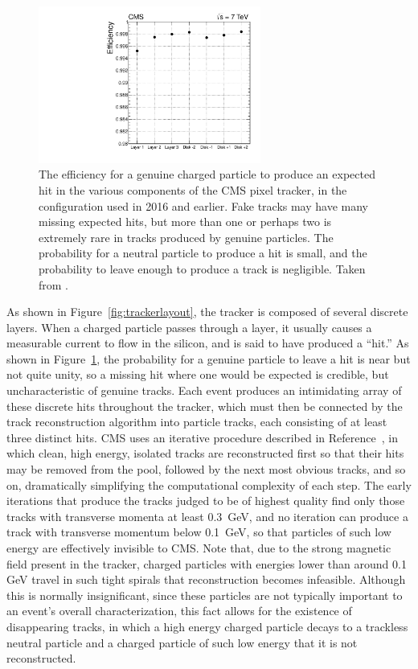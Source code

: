   \begin{figure}[h!]
    \centering
    \includegraphics[width=0.65\textwidth]{figures/hitefficiency.pdf}
    \caption[Efficiency for a genuine particle to leave an expected hit in the CMS tracker.]{
      The efficiency for a genuine charged particle to produce an expected hit in the various components of the CMS pixel tracker, in the configuration used in 2016 and earlier. 
      Fake tracks may have many missing expected hits, but more than one or perhaps two is extremely rare in tracks produced by genuine particles.
      The probability for a neutral particle to produce a hit is small, and the probability to leave enough to produce a track is negligible.
      Taken from \cite{cmstracking}.}
    \label{fig:hitefficiency}
  \end{figure}  

  As shown in Figure~\ref{fig:trackerlayout}, the tracker is composed of several discrete layers.
  When a charged particle passes through a layer, it usually causes a measurable current to flow in the silicon, and is said to have produced a ``hit.''  
  As shown in Figure~\ref{fig:hitefficiency}, the probability for a genuine particle to leave a hit is near but not quite unity, so a missing hit where one would be expected is credible, but uncharacteristic of genuine tracks.
  Each event produces an intimidating array of these discrete hits throughout the tracker, which must then be connected by the track reconstruction algorithm into particle tracks, each consisting of at least three distinct hits.
  CMS uses an iterative procedure described in Reference~\cite{cmstracking}, in which clean, high energy, isolated tracks are reconstructed first so that their hits may be removed from the pool, followed by the next most obvious tracks, and so on, dramatically simplifying the computational complexity of each step.
  The early iterations that produce the tracks judged to be of highest quality find only those tracks with transverse momenta at least 0.3~GeV, and no iteration can produce a track with transverse momentum below 0.1~GeV, so that particles of such low energy are effectively invisible to CMS.
  Note that, due to the strong magnetic field present in the tracker, charged particles with energies lower than around 0.1 GeV travel in such tight spirals that reconstruction becomes infeasible.
  Although this is normally insignificant, since these particles are not typically important to an event's overall characterization, this fact allows for the existence of disappearing tracks, in which a high energy charged particle decays to a trackless neutral particle and a charged particle of such low energy that it is not reconstructed.

